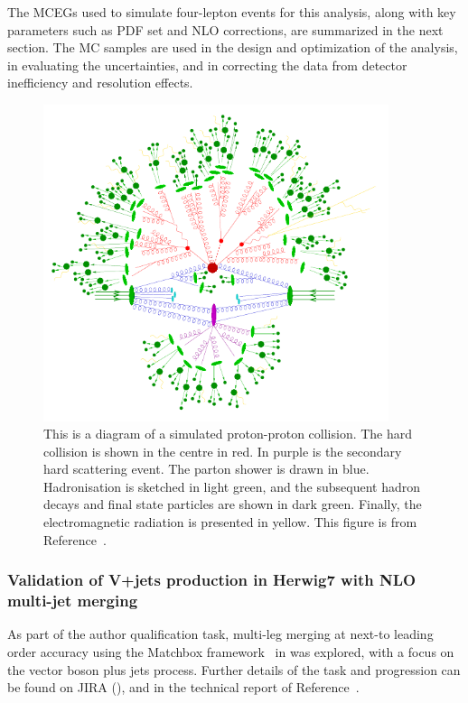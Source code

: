 The MCEGs used to simulate four-lepton events for this analysis, along with key parameters such as PDF set and NLO corrections, are summarized in the next section. The MC samples are used in the design and optimization of the analysis, in evaluating the uncertainties, and in correcting the data from detector inefficiency and resolution effects.

\begin{figure}[htb!]
    \centering
    \includegraphics[width=0.90\textwidth]{Figures/LHC/HocheMCEG_final.pdf}
    \caption{This is a diagram of a simulated proton-proton collision. The hard collision is shown in the centre in red. In purple is the secondary hard scattering event. The parton shower is drawn in blue. Hadronisation is sketched in light green, and the subsequent hadron decays and final state particles are shown in dark green. Finally, the electromagnetic radiation is presented in yellow. This figure is from Reference~\cite{hoche2015introduction}.}
    \label{fig:MCEG}
\end{figure}

\subsubsection{Validation of V+jets production in Herwig7 with NLO multi-jet merging}
As part of the \ATLAS author qualification task, multi-leg merging at next-to leading order accuracy using the Matchbox framework~\cite{Bellm:2019zci} in  was explored, with a focus on the vector boson plus jets process. Further details of the task and progression can be found on JIRA (\href{https://its.cern.ch/jira/browse/AGENE-1453}{\code{\textcolor{blue}{AGENE-1453}}}), and in the technical report of Reference~\cite{Huang:2676143}.

